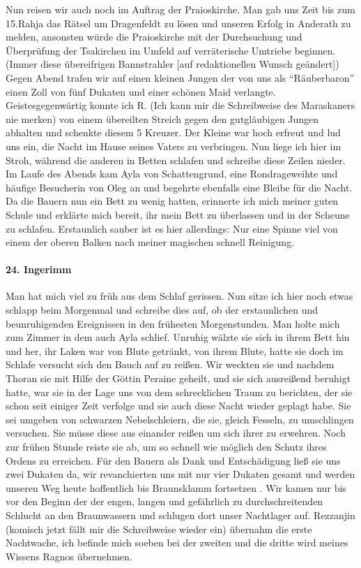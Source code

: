 Nun reisen wir auch noch im Auftrag der Praioskirche. Man gab uns Zeit bis zum 15.Rahja das Rätsel um Dragenfeldt  zu lösen und unseren Erfolg in Anderath zu melden, ansonsten würde die Praioskirche mit der Durchsuchung und Überprüfung der Tsakirchen im Umfeld auf verräterische Umtriebe beginnen. (Immer diese übereifrigen Bannstrahler [auf redaktionellen Wunsch geändert]) Gegen Abend trafen wir auf einen kleinen Jungen der von uns als ``Räuberbaron'' einen Zoll von fünf Dukaten und einer schönen Maid verlangte. Geistesgegenwärtig konnte ich R. (Ich kann mir die Schreibweise des Maraskaners nie merken) von einem übereilten Streich gegen den gutgläubigen Jungen abhalten und schenkte diesem 5 Kreuzer. Der Kleine war hoch erfreut und lud uns ein, die Nacht im Hause seines Vaters zu verbringen. Nun liege ich hier im Stroh, während die anderen in Betten schlafen und schreibe diese Zeilen nieder. Im Laufe des Abends kam Ayla von Schattengrund, eine Rondrageweihte und häufige Besucherin von Oleg an und begehrte ebenfalls eine Bleibe für die Nacht. Da die Bauern nun ein Bett zu wenig hatten, erinnerte ich mich meiner guten Schule und erklärte mich bereit, ihr mein Bett zu überlassen und in der Scheune zu schlafen. Erstaunlich sauber ist es hier allerdings: Nur eine Spinne viel von einem der oberen Balken nach meiner magischen schnell Reinigung.

\paragraph{24. Ingerimm}

Man hat mich viel zu früh aus dem Schlaf gerissen. Nun sitze ich hier noch etwas schlapp beim Morgenmal und schreibe dies auf, ob der erstaunlichen und beunruhigenden Ereignissen in den frühesten Morgenstunden. Man holte mich zum Zimmer in dem auch Ayla schlief. Unruhig wälzte sie sich in ihrem Bett hin und her, ihr Laken war von Blute getränkt, von ihrem Blute, hatte sie doch im Schlafe versucht sich den Bauch auf zu reißen. Wir weckten sie und nachdem Thoran sie mit Hilfe der Göttin Peraine geheilt, und sie sich ausreißend beruhigt hatte, war sie in der Lage uns von dem schrecklichen Traum zu berichten, der sie schon seit einiger Zeit verfolge und sie auch diese Nacht wieder geplagt habe. Sie sei umgeben von schwarzen Nebelschleiern, die sie, gleich Fesseln, zu umschlingen versuchen. Sie müsse diese aus einander reißen um sich ihrer zu erwehren. Noch zur frühen Stunde reiste sie ab, um so schnell wie möglich den Schutz ihres Ordens zu erreichen. Für den Bauern als Dank und Entschädigung ließ sie uns zwei Dukaten da, wir revanchierten uns mit nur vier Dukaten gesamt und werden unseren Weg heute hoffentlich bis Braunsklamm fortsetzen .
Wir kamen nur bis vor den Beginn der der engen, langen und gefährlich zu durchschreitenden Schlucht an den Braunwassern und schlugen dort unser Nachtlager auf. Rezzanjin (komisch jetzt fällt mir die Schreibweise wieder ein) übernahm die erste Nachtwache, ich befinde mich soeben bei der zweiten und die dritte wird meines Wissens Ragnos übernehmen.

